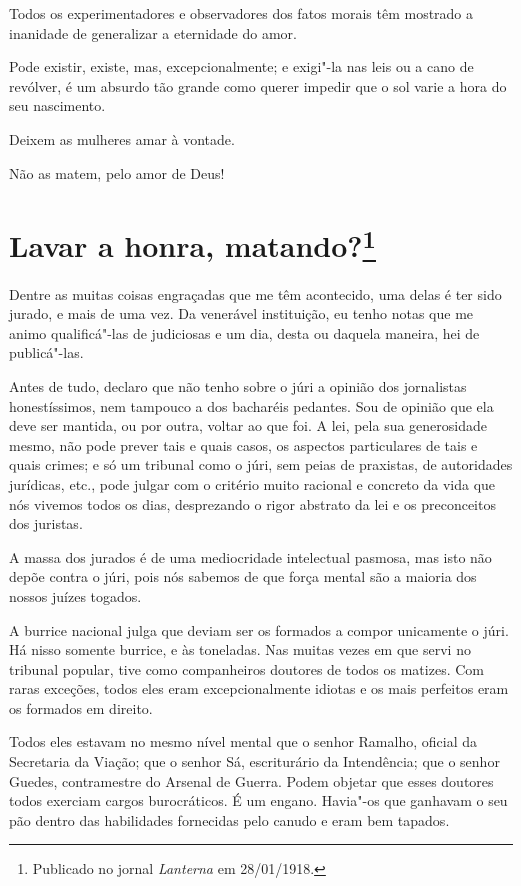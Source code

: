 Todos os experimentadores e observadores dos fatos morais têm mostrado a
inanidade de generalizar a eternidade do amor.

Pode existir, existe, mas, excepcionalmente; e exigi"-la nas leis ou a
cano de revólver, é um absurdo tão grande como querer impedir que o sol
varie a hora do seu nascimento.

Deixem as mulheres amar à vontade.

Não as matem, pelo amor de Deus!

\chapter[Lavar a honra, matando?]{Lavar a honra, matando?\footnote[*]{Publicado no jornal \emph{Lanterna} em 28/01/1918.}}

Dentre as muitas coisas engraçadas que me têm acontecido, uma delas é
ter sido jurado, e mais de uma vez. Da venerável instituição, eu tenho
notas que me animo qualificá"-las de judiciosas e um dia, desta ou
daquela maneira, hei de publicá"-las.

Antes de tudo, declaro que não tenho sobre o júri a opinião dos
jornalistas honestíssimos, nem tampouco a dos bacharéis pedantes. Sou de
opinião que ela deve ser mantida, ou por outra, voltar ao que foi. A
lei, pela sua generosidade mesmo, não pode prever tais e quais casos, os
aspectos particulares de tais e quais crimes; e só um tribu­nal como o
júri, sem peias de praxistas, de autoridades jurídicas, etc., pode
julgar com o critério muito racional e concreto da vida que nós vivemos
todos os dias, desprezando o rigor abstrato da lei e os preconceitos dos
juristas.

A massa dos jurados é de uma mediocridade intelectual pasmosa, mas isto
não depõe contra o júri, pois nós sabemos de que força mental são a
maioria dos nossos juízes togados.

A burrice nacional julga que deviam ser os formados a compor unicamente
o júri. Há nisso somente burrice, e às toneladas. Nas muitas vezes em
que servi no tribunal popular, tive como companheiros doutores de todos
os matizes. Com raras exceções, todos eles eram excepcionalmente idiotas
e os mais perfeitos eram os formados em direito.

Todos eles estavam no mesmo nível mental que o senhor Ramalho, oficial
da Secretaria da Viação; que o senhor Sá, escriturário da Intendência;
que o senhor Guedes, contramestre do Arsenal de Guerra. Podem objetar
que esses doutores todos exerciam cargos burocráticos. É um engano.
Havia"-os que ganhavam o seu pão dentro das habilidades fornecidas pelo
canudo e eram bem tapados.

